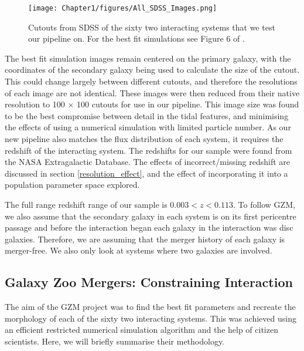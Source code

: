 \begin{figure}
    \centering
    \texttt{[image: Chapter1/figures/All\_SDSS\_Images.png]}
    \caption{Cutouts from SDSS of the sixty two interacting systems that we test our pipeline on. For the best fit simulations see Figure 6 of \citet{Holincheck_16}.}
    \label{fig:Obj_Cutout}
\end{figure}

The best fit simulation images remain centered on the primary galaxy, with the coordinates of the secondary galaxy being used to calculate the size of the cutout. This could change largely between different cutouts, and therefore the resolutions of each image are not identical. These images were then reduced from their native resolution to 100 $\times$ 100 cutouts for use in our pipeline. This image size was found to be the best compromise between detail in the tidal features, and minimising the effects of using a numerical simulation with limited particle number. As our new pipeline also matches the flux distribution of each system, it requires the redshift of the interacting system. The redshifts for our sample were found from the NASA Extragalactic Database. The effects of incorrect/missing redshift are discussed in section \ref{resolution_effect}, and the effect of incorporating it into a population parameter space explored. 

The full range redshift range of our sample is $0.003 < z < 0.113$. To follow GZM, we also assume that the secondary galaxy in each system is on its first pericentre passage and before the interaction began each galaxy in the interaction was disc galaxies. Therefore, we are assuming that the merger history of each galaxy is merger-free. We also only look at systems where two galaxies are involved.

\subsection{Galaxy Zoo Mergers: Constraining Interaction}
The aim of the GZM project was to find the best fit parameters and recreate the morphology of each of the sixty two interacting systems. This was achieved using an efficient restricted numerical simulation algorithm and the help of citizen scientists. Here, we will briefly summarise their methodology.

